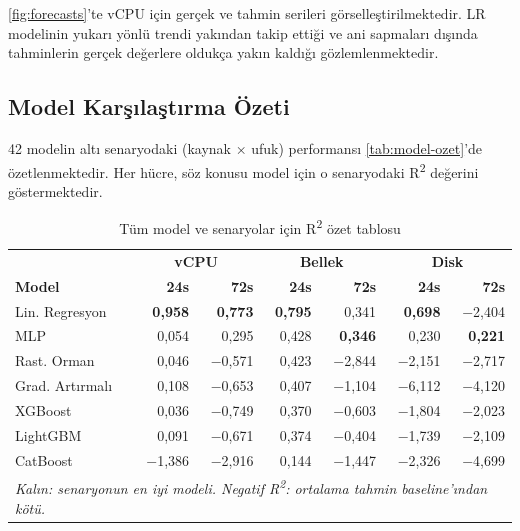 \autoref{fig:forecasts}'te vCPU için gerçek ve tahmin serileri görselleştirilmektedir.
LR modelinin yukarı yönlü trendi yakından takip ettiği ve ani sapmaları dışında tahminlerin gerçek değerlere oldukça yakın kaldığı gözlemlenmektedir.


\subsection{Model Karşılaştırma Özeti}

42 modelin altı senaryodaki (kaynak × ufuk) performansı \autoref{tab:model-ozet}'de özetlenmektedir.
Her hücre, söz konusu model için o senaryodaki R\textsuperscript{2} değerini göstermektedir.

\begin{table}[htbp]
    \centering
    \caption{Tüm model ve senaryolar için R\textsuperscript{2} özet tablosu}
    \label{tab:model-ozet}
    \begin{tabular}{lrrrrrr}
        & \multicolumn{2}{c}{\textbf{vCPU}} & \multicolumn{2}{c}{\textbf{Bellek}} & \multicolumn{2}{c}{\textbf{Disk}} \\
        \textbf{Model} & \textbf{24s} & \textbf{72s} & \textbf{24s} & \textbf{72s} & \textbf{24s} & \textbf{72s} \\
        \hline
        Lin. Regresyon  & \textbf{0{,}958} & \textbf{0{,}773} & \textbf{0{,}795} & 0{,}341          & \textbf{0{,}698} & $-$2{,}404 \\
        MLP             & 0{,}054          & 0{,}295          & 0{,}428          & \textbf{0{,}346} & 0{,}230          & \textbf{0{,}221} \\
        Rast. Orman     & 0{,}046          & $-$0{,}571       & 0{,}423          & $-$2{,}844       & $-$2{,}151       & $-$2{,}717 \\
        Grad. Artırmalı & 0{,}108          & $-$0{,}653       & 0{,}407          & $-$1{,}104       & $-$6{,}112       & $-$4{,}120 \\
        XGBoost         & 0{,}036          & $-$0{,}749       & 0{,}370          & $-$0{,}603       & $-$1{,}804       & $-$2{,}023 \\
        LightGBM        & 0{,}091          & $-$0{,}671       & 0{,}374          & $-$0{,}404       & $-$1{,}739       & $-$2{,}109 \\
        CatBoost        & $-$1{,}386       & $-$2{,}916       & 0{,}144          & $-$1{,}447       & $-$2{,}326       & $-$4{,}699 \\
        \hline
        \multicolumn{7}{l}{\textit{Kalın: senaryonun en iyi modeli. Negatif R\textsuperscript{2}: ortalama tahmin baseline'ından kötü.}} \\
    \end{tabular}
\end{table}

